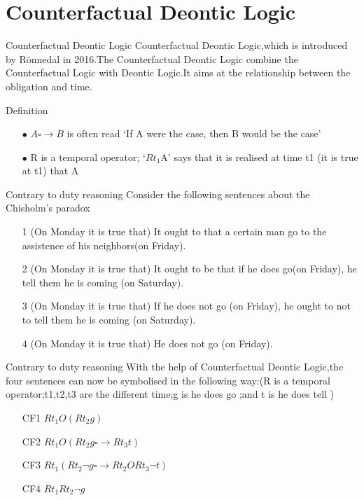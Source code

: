 \documentclass{beamer}
\begin{document}
\section{Counterfactual Deontic Logic}
\begin{frame}{Counterfactual Deontic Logic}
Counterfactual Deontic Logic,which is introduced by Rönnedal in 2016.The Counterfactual Deontic Logic combine the Counterfactual Logic with Deontic Logic.It aims at the relationship between the obligation and time.
\begin{block}{Definition}
\begin{enumerate}
  \item[$\bullet$]$A\square \rightarrow B$ is often read ‘If A were the case, then B would be the case’
\item[$\bullet$]R is a temporal operator; ‘$Rt_{1}$A’ says that it is realised at time t1 (it is true at t1) that A
\end{enumerate}
\end{block}
\end{frame}
 \begin{frame}{Contrary to duty reasoning}
 Consider the following sentences about the Chisholm's paradox
\begin{enumerate}
\item[1] (On Monday it is true that) It ought to that a certain man go to the assistence of  his neighbors(on Friday).
\item[2] (On Monday it is true that) It ought to be that if he does go(on Friday), he tell them he is coming (on Saturday).
\item[3](On Monday it is true that) If he does not go (on Friday), he ought to not to tell them he is coming (on Saturday).
\item[4](On Monday it is true that) He does not go (on Friday).
\end{enumerate}
     
 \end{frame}
 \begin{frame}{Contrary to duty reasoning}
 With the help of Counterfactual Deontic Logic,the four sentences can now be symbolised in the following way:(R is a temporal operator;t1,t2,t3 are the different time;g is he does go ;and t is he does tell )
\begin{enumerate}
\item[CF1]$Rt_{1}O(Rt_{2}g)$
\item[CF2]$Rt_{1}O(Rt_{2}g \square \rightarrow Rt_{3}t)$
\item[CF3]$Rt_{1}(Rt_{2}\neg g \square \rightarrow Rt_{2}ORt_{3}\neg t)$
\item[CF4]$Rt_{1}Rt_{2}\neg g$
\end{enumerate}
 \end{frame}
\end{document}
